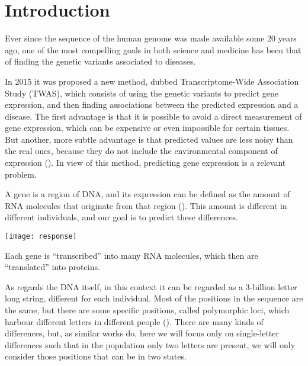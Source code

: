 \section{Introduction}

Ever since the sequence of the human genome was made available some 20 
years ago,  one of the most 
compelling goals in both science and medicine has been that of finding 
the genetic variants associated to diseases.


In 2015 it was proposed a new method, 
 dubbed Transcriptome-Wide 
Association Study (TWAS), which consists of using the genetic variants 
to predict gene expression, and then finding associations between the 
predicted expression and a disease. The first advantage is that it is 
possible to avoid a direct measurement of gene expression, which can be 
expensive or even impossible for certain tissues. But another, more 
subtle advantage is that predicted values are less noisy than the real 
ones, because they do not include the environmental component of 
expression (). In view of this method, predicting gene 
expression is a relevant problem.

A gene is a region of DNA, and its expression can be defined as the 
amount of RNA molecules that originate from that region 
(). This amount is different in different individuals, 
and our goal is to predict these differences.

\begin{marginfigure}[-3.8cm]
  \texttt{[image: response]}
  \caption{Each gene is \enquote{transcribed} into many RNA molecules, 
which then are \enquote{translated} into proteins.}
\end{marginfigure}

As regards the DNA itself, in this context it can be regarded as a 
3-billion letter long string, different for each individual. Most of the 
positions in the sequence are the same, but there are some specific
positions, called polymorphic loci, which harbour different letters in 
different people (). There are many kinds of 
differences, but, as similar works do, 
 here we will focus only on 
single-letter differences such that in the population only two letters 
are present, \ie we will only consider those positions that can be in 
two states.

